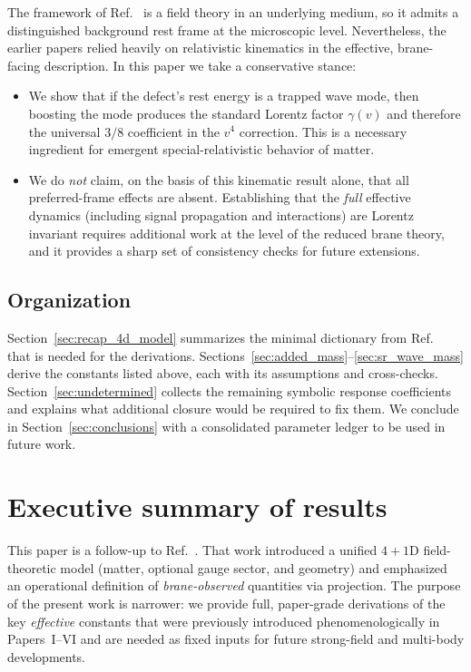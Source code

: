 \documentclass[11pt]{article}
\begin{document}
The framework of Ref.~\cite{norris2026_4d_model} is a field theory in an underlying medium, so it admits a distinguished
background rest frame at the microscopic level. Nevertheless, the earlier papers relied heavily
on relativistic kinematics in the effective, brane-facing description. In this paper we take a
conservative stance:
\begin{itemize}
  \item We show that if the defect's rest energy is a trapped wave mode, then boosting the mode
  produces the standard Lorentz factor $\gamma(v)$ and therefore the universal $3/8$ coefficient
  in the $v^4$ correction. This is a necessary ingredient for emergent special-relativistic
  behavior of matter.
  \item We do \emph{not} claim, on the basis of this kinematic result alone, that all preferred-frame
  effects are absent. Establishing that the \emph{full} effective dynamics (including signal
  propagation and interactions) are Lorentz invariant requires additional work at the level of the
  reduced brane theory, and it provides a sharp set of consistency checks for future extensions.
\end{itemize}

\subsection{Organization}

Section~\ref{sec:recap_4d_model} summarizes the minimal dictionary from Ref.~\cite{norris2026_4d_model} that is needed
for the derivations. Sections~\ref{sec:added_mass}--\ref{sec:sr_wave_mass} derive the constants
listed above, each with its assumptions and cross-checks. Section~\ref{sec:undetermined}
collects the remaining symbolic response coefficients and explains what additional closure would
be required to fix them. We conclude in Section~\ref{sec:conclusions} with a consolidated parameter
ledger to be used in future work.

\section{Executive summary of results}
\label{sec:exec-summary}

This paper is a follow-up to Ref.~\cite{norris2026_4d_model}. That work introduced a unified \(4\!+\!1\)D field-theoretic model (matter, optional gauge sector, and geometry) and emphasized an operational definition of \emph{brane-observed} quantities via projection. The purpose of the present work is narrower: we provide full, paper-grade derivations of the key \emph{effective} constants that were previously introduced phenomenologically in Papers~I--VI and are needed as fixed inputs for future strong-field and multi-body developments.
\end{document}
